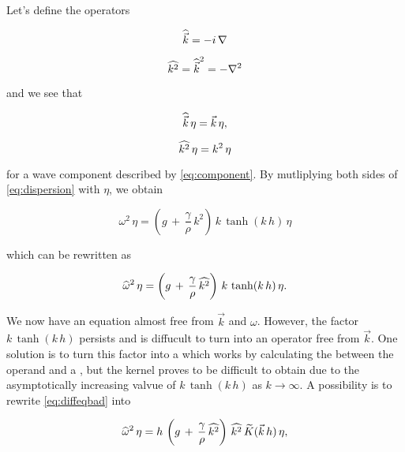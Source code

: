Let's define the operators

\begin{samepage}
\begin{equation} \label{eq:opkvec}
\widehat{\vec{k}} = -i\,\nabla
\end{equation}

\begin{equation} \label{eq:opk2}
\widehat{k^2} = \widehat{\vec{k}}^2 = -\nabla^2
\end{equation}
\end{samepage}

and we see that 

\begin{samepage}
\begin{equation} \label{eq:opkvec1action}
\vop{k}\,\eta = \vec{k}\,\eta,%
\end{equation}

\begin{equation} \label{eq:opk2action}
\widehat{k^2}\,\eta = k^2\,\eta
\end{equation}
\end{samepage}

for a wave component described by \eqref{eq:component}. By mutliplying both sides of \eqref{eq:dispersion} with $\eta$, we obtain

\begin{equation}
\omega^2\,\eta = \left(g\,+\,\frac{\gamma}{\rho}\,k^2\right)\,k\,\tanh(k\,h)\,\eta
\end{equation}

which can be rewritten as

\begin{equation} \label{eq:diffeqbad}
\widehat{\omega}^2\,\eta = \left(g\,+\,\frac{\gamma}{\rho}\,\widehat{k^2}\right)\,k\,\tanh(k\,h)\,\eta.
\end{equation}

We now have an equation almost free from $\vec{k}$ and $\omega$. However, the factor $k\,\tanh(k\,h)$ persists and is diffucult to turn into an operator free from $\vec{k}$. One solution is to turn this factor into a  which works by calculating the  between the operand and a , but the kernel proves to be difficult to obtain due to the asymptotically increasing valvue of $k\,\tanh(k\,h)$ as $k\rightarrow\infty$. A possibility is to rewrite \eqref{eq:diffeqbad} into

\begin{equation} \label{eq:diffeqbetter}
\widehat{\omega}^2\,\eta = h\,\left(g\,+\,\frac{\gamma}{\rho}\,\widehat{k^2}\right)\,\widehat{k^2}\,\widetilde{K}(\vec{k}\,h)\,\eta,
\end{equation}

